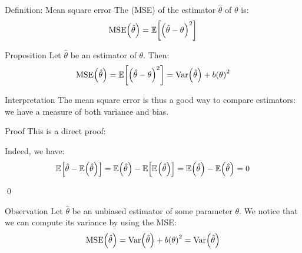 \documentclass[a4paper]{article}
\begin{document}
\begin{parag}{Definition: Mean square error}
    The  (MSE) of the estimator $\hat{\theta}$ of $\theta$ is: 
    \[\text{MSE}\left(\hat{\theta}\right) = \exval\left[\left(\hat{\theta} - \theta\right)^2\right]\]
\end{parag}

\begin{parag}{Proposition}
    Let $\hat{\theta}$ be an estimator of $\theta$. Then: 
    \[\text{MSE}\left(\hat{\theta}\right) = \exval\left[\left(\hat{\theta} - \theta\right)^2\right] = \Var\left(\hat{\theta}\right) + b\left(\theta\right)^2\]
    
    \begin{subparag}{Interpretation}
        The mean square error is thus a good way to compare estimators: we have a measure of both variance and bias.
    \end{subparag}
    
    \begin{subparag}{Proof}
        This is a direct proof:
        
        Indeed, we have: 
        \[\exval\left[\hat{\theta} - \exval\left(\hat{\theta}\right)\right] = \exval\left(\hat{\theta}\right) - \exval\left[\exval\left(\hat{\theta}\right)\right] = \exval\left(\hat{\theta}\right) - \exval\left(\hat{\theta}\right) = 0\]
        
        \qed
    \end{subparag}
\end{parag}

\begin{parag}{Observation}
    Let $\hat{\theta}$ be an unbiased estimator of some parameter $\theta$. We notice that we can compute its variance by using the MSE:
    \[\text{MSE}\left(\hat{\theta}\right) = \Var\left(\hat{\theta}\right) + b\left(\theta\right)^2 = \Var\left(\hat{\theta}\right)\]
\end{parag}
\end{document}
